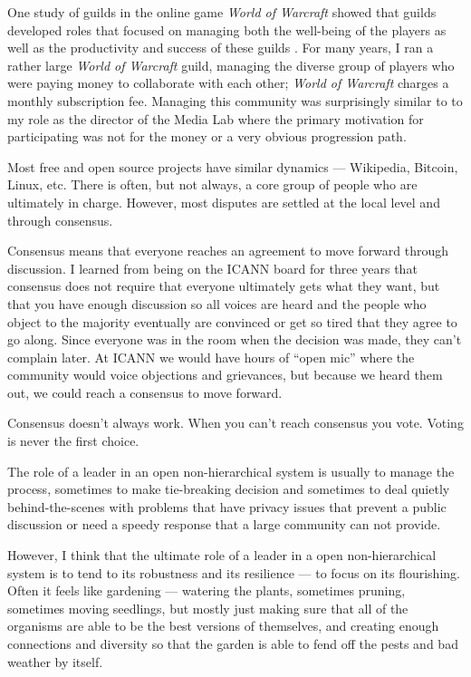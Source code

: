 One study of guilds in the online game \emph{World of Warcraft} showed that guilds developed roles that focused on managing both the well-being of the players as well as the productivity and success of these guilds \cite{williams2014structural}. For many years, I ran a rather large \emph{World of Warcraft} guild, managing the diverse group of players who were paying money to collaborate with each other; \emph{World of Warcraft} charges a monthly subscription fee. Managing this community was surprisingly similar to to my role as the director of the Media Lab where the primary motivation for participating was not for the money or a very obvious progression path.

Most free and open source projects have similar dynamics --- Wikipedia, Bitcoin, Linux, etc. There is often, but not always, a core group of people who are ultimately in charge. However, most disputes are settled at the local level and through consensus.

Consensus means that everyone reaches an agreement to move forward through discussion. I learned from being on the ICANN board for three years that consensus does not require that everyone ultimately gets what they want, but that you have enough discussion so all voices are heard and the people who object to the majority eventually are convinced or get so tired that they agree to go along. Since everyone was in the room when the decision was made, they can't complain later. At ICANN we would have hours of ``open mic'' where the community would voice objections and grievances, but because we heard them out, we could reach a consensus to move forward.

Consensus doesn't always work. When you can't reach consensus you vote. Voting is never the first choice.

The role of a leader in an open non-hierarchical system is usually to manage the process, sometimes to make tie-breaking decision and sometimes to deal quietly behind-the-scenes with problems that have privacy issues that prevent a public discussion or need a speedy response that a large community can not provide.

However, I think that the ultimate role of a leader in a open non-hierarchical system is to tend to its robustness and its resilience --- to focus on its flourishing. Often it feels like gardening --- watering the plants, sometimes pruning, sometimes moving seedlings, but mostly just making sure that all of the organisms are able to be the best versions of themselves, and creating enough connections and diversity so that the garden is able to fend off the pests and bad weather by itself.

